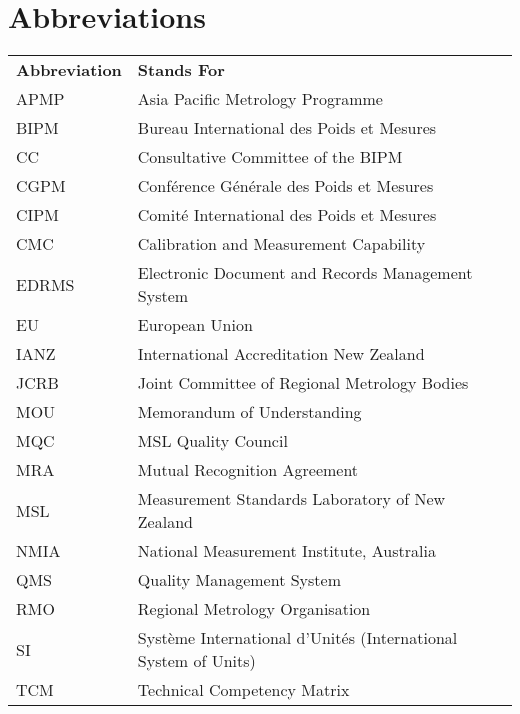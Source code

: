 \section{Abbreviations}
\begin{center}
{\renewcommand*{\arraystretch}{1.4}
\begin{tabular}{p{14.07em}p{25em}}
	\rowcolor[rgb]{ 0,  0,  0} 
	\textcolor[rgb]{ 1,  1,  1}{\textbf{Abbreviation}} & 
	\textcolor[rgb]{ 1,  1,  1}{\textbf{Stands For}} \\
APMP & Asia Pacific Metrology Programme \\ 
BIPM & Bureau International des Poids et Mesures \\ 
CC & Consultative Committee of the BIPM \\ 
CGPM & Conf\'erence G\'en\'erale des Poids et Mesures \\ 
CIPM & Comit\'e International des Poids et Mesures \\
CMC & Calibration and Measurement Capability \\
EDRMS & Electronic Document and Records Management System \\
EU & European Union \\
IANZ & International Accreditation New Zealand \\
JCRB & Joint Committee of Regional Metrology Bodies \\
MOU & Memorandum of Understanding \\
MQC & MSL Quality Council \\
MRA & Mutual Recognition Agreement \\
MSL & Measurement Standards Laboratory of New Zealand \\
NMIA & National Measurement Institute, Australia \\
QMS & Quality Management System \\
RMO & Regional Metrology Organisation \\
SI & Système International d'Unités (International System of Units) \\
TCM & Technical Competency Matrix \\
\hline 
\end{tabular} 
}
\end{center}
